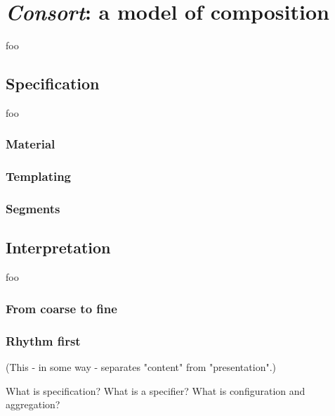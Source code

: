 \chapter{\emph{Consort}: a model of composition}

foo

\section{Specification}

foo

\subsection{Material}

\subsection{Templating}

\subsection{Segments}

\section{Interpretation}

foo

\subsection{From coarse to fine}

\subsection{Rhythm first}

(This - in some way - separates "content" from "presentation".)

What is specification? What is a specifier? What is configuration and
aggregation?

